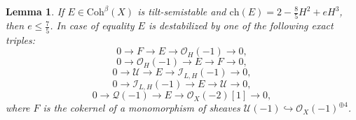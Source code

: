 \documentclass{amsart}
\newtheorem{lemma}[theorem]{Lemma}
\begin{document}
	\begin{lemma}\label{2 0 -8/5} If $E\in\mathrm{Coh}^\beta(X)$ is tilt-semistable and $\mathrm{ch}(E)=2-\frac 85 H^2+eH^3$, then $e\le\frac 75$. In case of equality $E$ is destabilized by one of the following exact triples:
		\begin{equation}\label{triple18}0\to F\to E\to \mathcal O_H(-1)\to 0,\end{equation}
		\begin{equation}\label{triple19}0\to \mathcal O_H(-1)\to E\to F\to 0,\end{equation}
		\begin{equation}\label{triple20}0\to\mathcal U\to E\to \mathcal I_{L,H}(-1)\to 0,\end{equation}
		\begin{equation}\label{triple23}0\to\mathcal I_{L,H}(-1)\to E\to\mathcal U\to 0,\end{equation}
		\begin{equation}\label{triple21}0\to\mathcal Q(-1)\to E\to \mathcal O_X(-2)[1]\to 0,\end{equation}
		where $F$ is the cokernel of a monomorphism of sheaves $\mathcal U(-1)\hookrightarrow\mathcal O_X(-1)^{\oplus 4}$.
	\end{lemma}
	
\end{document}
